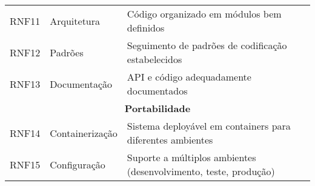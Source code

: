 \begin{table}[htbp]
{\begin{tabular}{|c|l|p{9cm}|}
      \hline
      RNF11       & Arquitetura        & Código organizado em módulos bem definidos                              \\
      RNF12       & Padrões            & Seguimento de padrões de codificação estabelecidos                      \\
      RNF13       & Documentação       & API e código adequadamente documentados                                 \\
      \hline
      \multicolumn{3}{|c|}{\textbf{Portabilidade}}                                                               \\
      \hline
      RNF14       & Containerização    & Sistema deployável em containers para diferentes ambientes              \\
      RNF15       & Configuração       & Suporte a múltiplos ambientes (desenvolvimento, teste, produção)        \\
      \hline
    \end{tabular}
  }
\end{table}